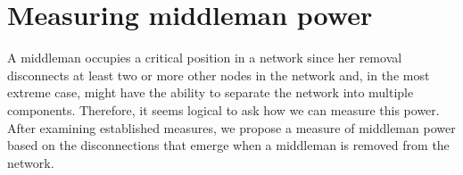 \documentclass[11pt,fleqn]{article}
\begin{document}



\section{Measuring middleman power}
\label{sec:middlemanPower}

A middleman occupies a critical position in a network since her removal disconnects at least two or more other nodes in the network and, in the most extreme case, might have the ability to separate the network into multiple components. Therefore, it seems logical to ask how we can measure this power. After examining established measures, we propose a measure of middleman power based on the disconnections that emerge when a middleman is removed from the network.
\end{document}
